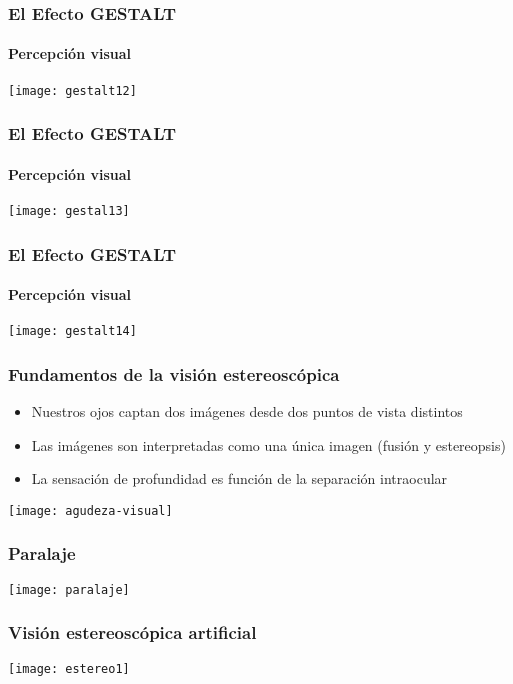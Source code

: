 \documentclass[14pt]{beamer}
\begin{document}
\begin{frame}
\frametitle{El Efecto GESTALT}
\framesubtitle{Percepción visual}
\begin{center}
\texttt{[image: gestalt12]}
\end{center}
\end{frame}
\begin{frame}
\frametitle{El Efecto GESTALT}
\framesubtitle{Percepción visual}
\begin{center}
\texttt{[image: gestal13]}
\end{center}
\end{frame}
\begin{frame}
\frametitle{El Efecto GESTALT}
\framesubtitle{Percepción visual}
\begin{center}
\texttt{[image: gestalt14]}
\end{center}
\end{frame}
\begin{frame}
\frametitle{Fundamentos de la visión estereoscópica}
\small{
\begin{itemize}
\item Nuestros ojos captan dos imágenes desde dos puntos de vista distintos\\
\item Las imágenes son interpretadas como una única imagen (fusión y estereopsis)\\
\item La sensación de profundidad es función de la separación intraocular

\end{itemize}
}
\begin{center}
\texttt{[image: agudeza-visual]}
\end{center}
\end{frame}
\begin{frame}
\frametitle{Paralaje}
\begin{center}
\texttt{[image: paralaje]}
\end{center}
\end{frame}
\begin{frame}
\frametitle{Visión estereoscópica artificial}
\begin{center}
\texttt{[image: estereo1]}
\end{center}
\end{frame}
\end{document}
